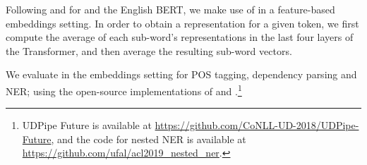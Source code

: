Following \citet{strakova2019neural} and \citet{straka2019evaluating} for \mbert and the English BERT, we make use of \camembert in a feature-based embeddings setting.
In order to obtain a representation for a given token, we first compute the average of each sub-word’s representations in the last four layers of the Transformer, and then average the resulting sub-word vectors.

We evaluate \camembert in the embeddings setting for POS tagging, dependency parsing and NER; using the open-source implementations of  and .\footnote{UDPipe Future is available at \url{https://github.com/CoNLL-UD-2018/UDPipe-Future}, and the code for nested NER is available at \url{https://github.com/ufal/acl2019_nested_ner}.}



